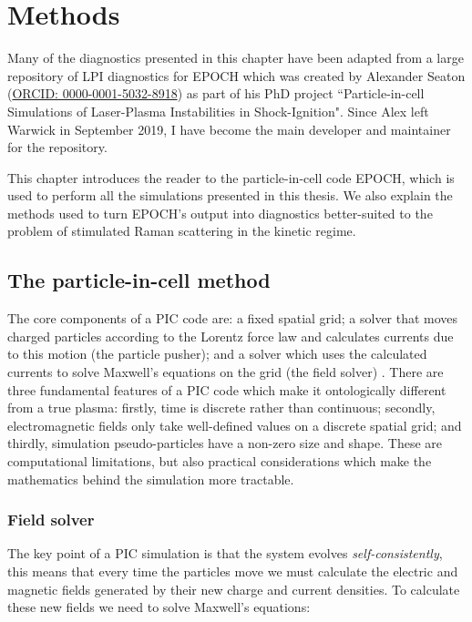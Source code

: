 \chapter{Methods}
\label{chp:methods}
 
Many of the diagnostics presented in this chapter have been adapted from a large repository of LPI diagnostics for EPOCH which was created by Alexander Seaton (\href{https://orcid.org/0000-0001-5032-8918}{ORCID: 0000-0001-5032-8918}) as part of his PhD project ``Particle-in-cell Simulations of Laser-Plasma Instabilities in Shock-Ignition". Since Alex left Warwick in September 2019, I have become the main developer and maintainer for the repository.

This chapter introduces the reader to the particle-in-cell code EPOCH, which is used to perform all the simulations presented in this thesis. We also explain the methods used to turn EPOCH's output into diagnostics better-suited to the problem of stimulated Raman scattering in the kinetic regime. 

\section{The particle-in-cell method}
The core components of a PIC code are: a fixed spatial grid; a solver that moves charged particles according to the Lorentz force law and calculates currents due to this motion (the particle pusher); and a solver which uses the calculated currents to solve Maxwell's equations on the grid (the field solver) \citep{Arber2015}. There are three fundamental features of a PIC code which make it ontologically different from a true plasma: firstly, time is discrete rather than continuous; secondly, electromagnetic fields only take well-defined values on a discrete spatial grid; and thirdly, simulation pseudo-particles have a non-zero size and shape. These are computational limitations, but also practical considerations which make the mathematics behind the simulation more tractable.


\subsection{Field solver}
The key point of a PIC simulation is that the system evolves \emph{self-consistently}, this means that every time the particles move we must calculate the electric and magnetic fields generated by their new charge and current densities. To calculate these new fields we need to solve Maxwell's equations:

